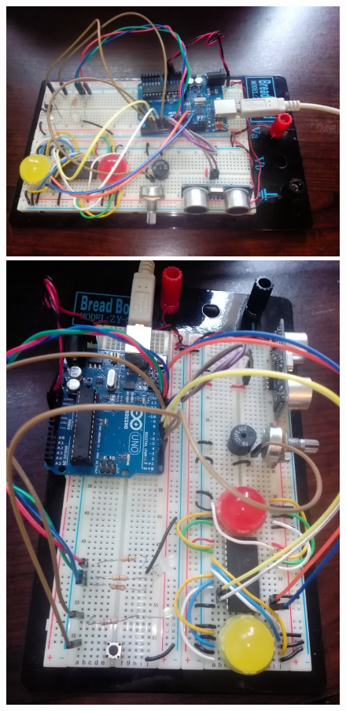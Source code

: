\begin{figure}[!ht]
	\centering
	\includegraphics[scale=.08]{img/real1.jpg}
	\caption{}
	\includegraphics[scale=.08]{img/real2.jpg}
	\caption{}
\end{figure}


